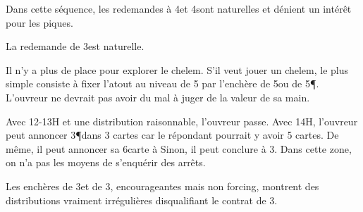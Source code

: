 \titre{2\C--2\P--3\P}
\begin{multicols}{2}

Dans cette séquence, les redemandes à 4\T et 4\K sont naturelles et dénient un intérêt pour les piques.

La redemande de 3\NT est naturelle.

Il n'y a plus de place pour explorer le chelem.  S'il veut jouer un chelem, le plus simple consiste à fixer l'atout au niveau de 5 par l'enchère de 5\C ou de 5\P. L'ouvreur ne devrait pas avoir du mal à juger de la valeur de sa main.

\end{multicols}

\titre{2\C--2\NT}

\begin{multicols}{2}

Avec 12-13H et une distribution raisonnable, l'ouvreur passe.
Avec 14H, l'ouvreur peut annoncer 3\P dans 3 cartes car le répondant pourrait y avoir 5 cartes. De même, il peut annoncer sa 6\ieme carte à \C
Sinon, il peut conclure à 3\NT. Dans cette zone, on n'a pas les moyens de s'enquérir des arrêts.

Les enchères de 3\T et de 3\K, encourageantes mais non forcing, montrent des distributions vraiment irrégulières disqualifiant le contrat de 3\NT.
\end{multicols}
